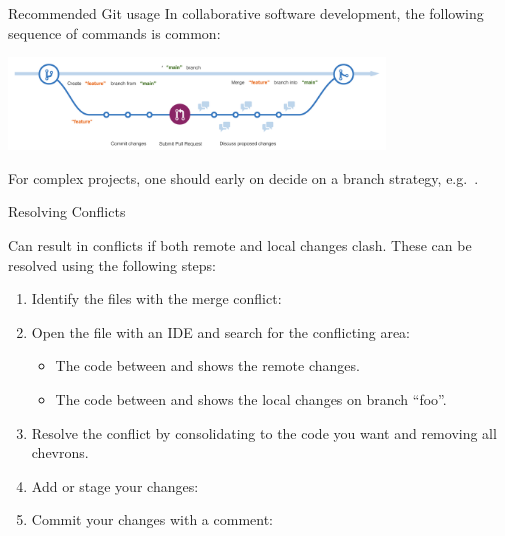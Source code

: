\documentclass{setbeamer}
\begin{document}
\begin{frame}{Recommended Git usage}
    In collaborative software development, the following sequence of commands is common:

    \begin{Center}
         {\Large\MVRightarrow{}}  {\Large\MVRightarrow{}}  {\Large\MVRightarrow{}} 
    \end{Center}
    
    \vspace{3mm}
    \centering
    \includegraphics[width=10cm]{resources/git_discussions.png}

    \vspace{3mm}

    For complex projects, one should early on decide on a branch strategy, e.g.~.
\end{frame}

\begin{frame}{Resolving Conflicts}

    \begin{Center}
         {\Large\MVRightarrow{}}  {\Large\MVRightarrow{}}  {\Large\MVRightarrow{}} 
    \end{Center}
    
	Can result in conflicts if both remote and local changes clash. These can be resolved using the following steps:

	\begin{enumerate}
	\item Identify the files with the merge conflict: 
	\item Open the file with an IDE and search for the conflicting area:
	\begin{itemize}
	\item The code between  and  shows the remote changes.
	\item The code between  and  shows the local changes on branch ``foo''.
	\end{itemize}    
	\item Resolve the conflict by consolidating to the code you want and removing all chevrons.
	\item Add or stage your changes: 
	\item Commit your changes with a comment: 
	\end{enumerate}

\end{frame}
\end{document}
